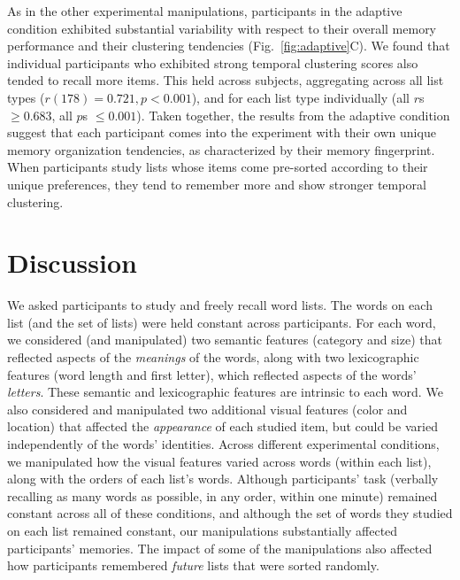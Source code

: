 \documentclass[11pt]{article}
\begin{document}
As in the other experimental manipulations, participants in the adaptive
condition exhibited substantial variability with respect to their overall
memory performance and their clustering tendencies (Fig.~\ref{fig:adaptive}C).
We found that individual participants who exhibited strong temporal clustering
scores also tended to recall more items. This held across subjects, aggregating
across all list types ($r(178) = 0.721, p < 0.001$), and for each list type
individually (all $r$s $\geq 0.683$, all $p$s $\leq 0.001$). Taken together,
the results from the adaptive condition suggest that each participant comes
into the experiment with their own unique memory organization tendencies, as
characterized by their memory fingerprint. When participants study lists whose
items come pre-sorted according to their unique preferences, they tend to remember
more and show stronger temporal clustering.

\section*{Discussion}


We asked participants to study and freely recall word lists. The words on each
list (and the set of lists) were held constant across participants. For each
word, we considered (and manipulated) two semantic features (category and size)
that reflected aspects of the \textit{meanings} of the words, along with two
lexicographic features (word length and first letter), which reflected aspects
of the words' \textit{letters}. These semantic and lexicographic features are
intrinsic to each word. We also considered and manipulated two additional
visual features (color and location) that affected the \textit{appearance} of
each studied item, but could be varied independently of the words' identities.
Across different experimental conditions, we manipulated how the visual
features varied across words (within each list), along with the orders of each
list's words. Although participants' task (verbally recalling as many words as
possible, in any order, within one minute) remained constant across all of
these conditions, and although the set of words they studied on each list
remained constant, our manipulations substantially affected participants'
memories. The impact of some of the manipulations also affected how
participants remembered \textit{future} lists that were sorted randomly.

\end{document}
